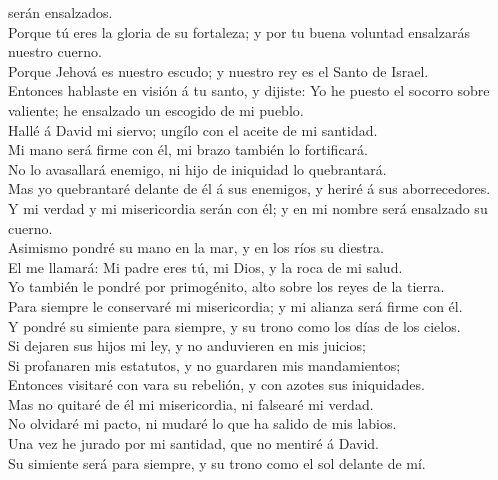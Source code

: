 serán ensalzados.\\
 Porque tú eres la gloria de su fortaleza; y por tu buena
voluntad ensalzarás nuestro cuerno.\\
 Porque Jehová es nuestro escudo; y nuestro rey es el Santo
de Israel.\\
 Entonces hablaste en visión á tu santo, y dijiste: Yo he
puesto el socorro sobre valiente; he ensalzado un escogido de mi
pueblo.\\
 Hallé á David mi siervo; ungílo con el aceite de mi
santidad.\\
 Mi mano será firme con él, mi brazo también lo
fortificará.\\
 No lo avasallará enemigo, ni hijo de iniquidad lo
quebrantará.\\
 Mas yo quebrantaré delante de él á sus enemigos, y heriré
á sus aborrecedores.\\
 Y mi verdad y mi misericordia serán con él; y en mi nombre
será ensalzado su cuerno.\\
 Asimismo pondré su mano en la mar, y en los ríos su
diestra.\\
 El me llamará: Mi padre eres tú, mi Dios, y la roca de mi
salud.\\
 Yo también le pondré por primogénito, alto sobre los reyes
de la tierra.\\
 Para siempre le conservaré mi misericordia; y mi alianza
será firme con él.\\
 Y pondré su simiente para siempre, y su trono como los
días de los cielos.\\
 Si dejaren sus hijos mi ley, y no anduvieren en mis
juicios;\\
 Si profanaren mis estatutos, y no guardaren mis
mandamientos;\\
 Entonces visitaré con vara su rebelión, y con azotes sus
iniquidades.\\
 Mas no quitaré de él mi misericordia, ni falsearé mi
verdad.\\
 No olvidaré mi pacto, ni mudaré lo que ha salido de mis
labios.\\
 Una vez he jurado por mi santidad, que no mentiré á
David.\\
 Su simiente será para siempre, y su trono como el sol
delante de mí.\\
